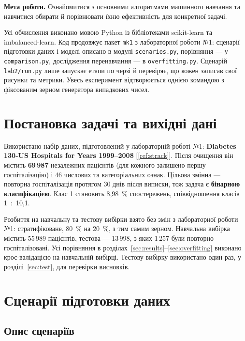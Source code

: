 \documentclass[14pt,a4paper]{extreport}
\begin{document}

\textbf{Мета роботи.} Ознайомитися з основними алгоритмами машинного навчання та навчитися обирати й порівнювати їхню ефективність для конкретної задачі.

Усі обчислення виконано мовою Python із бібліотеками scikit-learn та imbalanced-learn. Код продовжує пакет \texttt{mk1} з лабораторної роботи №1: сценарії підготовки даних і моделі описано в модулі \texttt{scenarios.py}, порівняння --- у \texttt{comparison.py}, дослідження перенавчання --- в \texttt{overfitting.py}. Сценарій \texttt{lab2/run.py} лише запускає етапи по черзі й перевіряє, що кожен записав свої рисунки та метрики. Увесь експеримент відтворюється однією командою з фіксованим зерном генератора випадкових чисел.

\section{Постановка задачі та вихідні дані}

Використано набір даних, підготовлений у лабораторній роботі №1: \textbf{Diabetes 130-US Hospitals for Years 1999--2008} [\ref{ref:strack}]. Після очищення він містить \textbf{69\,987} незалежних пацієнтів (для кожного залишено першу госпіталізацію) і 46 числових та категоріальних ознак. Цільова змінна --- повторна госпіталізація протягом 30 днів після виписки, тож задача є \textbf{бінарною класифікацією}. Клас 1 становить 8,98~\% спостережень, співвідношення класів 1~:~10,1.

Розбиття на навчальну та тестову вибірки взято без змін з лабораторної роботи №1: стратифіковане, 80~\% на 20~\%, з тим самим зерном. Навчальна вибірка містить 55\,989 пацієнтів, тестова --- 13\,998, з яких 1\,257 були повторно госпіталізовані. Усі порівняння в розділах~\ref{sec:results}--\ref{sec:overfitting} виконано крос-валідацією на навчальній вибірці. Тестову вибірку використано один раз, у розділі~\ref{sec:test}, для перевірки висновків.

\section{Сценарії підготовки даних}
\label{sec:scenarios}

\subsection{Опис сценаріїв}
\end{document}
